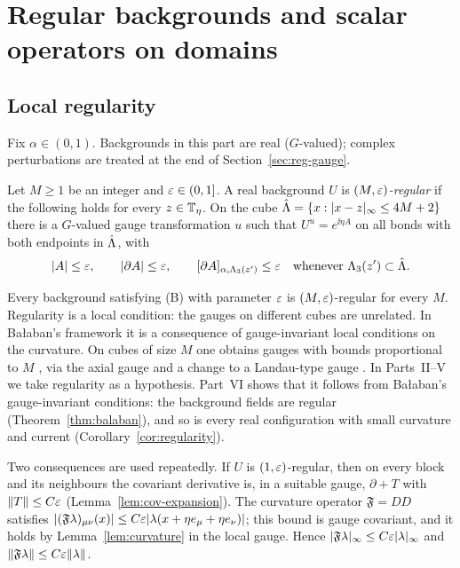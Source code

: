 \section{Regular backgrounds and scalar operators on domains}\label{sec:reg-scalar}

\subsection{Local regularity}

Fix $\alpha\in(0,1)$. Backgrounds in this part are real ($G$-valued); complex perturbations are treated at the end of Section~\ref{sec:reg-gauge}.

\begin{definition}\label{def:regular}
Let $M\ge1$ be an integer and $\varepsilon\in(0,1]$. A real background $U$ is \emph{$(M,\varepsilon)$-regular} if the following holds for every $z\in\mathbb T_\eta$. On the cube $\hat{\Lambda}=\{x:|x-z|_\infty\le4M+2\}$ there is a $G$-valued gauge transformation $u$ such that $U^u=e^{\ii\eta A}$ on all bonds with both endpoints in $\hat{\Lambda}$, with
\[
|A|\le\varepsilon,\qquad|\partial A|\le\varepsilon,\qquad[\partial A]_{\alpha,\Lambda_3(z')}\le\varepsilon\quad\text{whenever }\Lambda_3(z')\subset\hat{\Lambda} .
\]
\end{definition}

Every background satisfying (B) with parameter $\varepsilon$ is $(M,\varepsilon)$-regular for every $M$. Regularity is a local condition: the gauges on different cubes are unrelated. In Ba\l aban's framework it is a consequence of gauge-invariant local conditions on the curvature. On cubes of size $M$ one obtains gauges with bounds proportional to $M$ \cite[(3.35)--(3.36)]{BalBackground}, via the axial gauge and a change to a Landau-type gauge \cite[Theorem~2]{BalReg}. In Parts~II--V we take regularity as a hypothesis. Part~VI shows that it follows from Ba\l aban's gauge-invariant conditions: the background fields are regular (Theorem~\ref{thm:balaban}), and so is every real configuration with small curvature and current (Corollary~\ref{cor:regularity}).

Two consequences are used repeatedly. If $U$ is $(1,\varepsilon)$-regular, then on every block and its neighbours the covariant derivative is, in a suitable gauge, $\partial+T$ with $\|T\|\le C\varepsilon$ (Lemma~\ref{lem:cov-expansion}). The curvature operator $\mathfrak F=DD$ satisfies $|(\mathfrak F\lambda)_{\mu\nu}(x)|\le C\varepsilon|\lambda(x+\eta e_\mu+\eta e_\nu)|$; this bound is gauge covariant, and it holds by Lemma~\ref{lem:curvature} in the local gauge. Hence $|\mathfrak F\lambda|_\infty\le C\varepsilon|\lambda|_\infty$ and $\|\mathfrak F\lambda\|\le C\varepsilon\|\lambda\|$.

